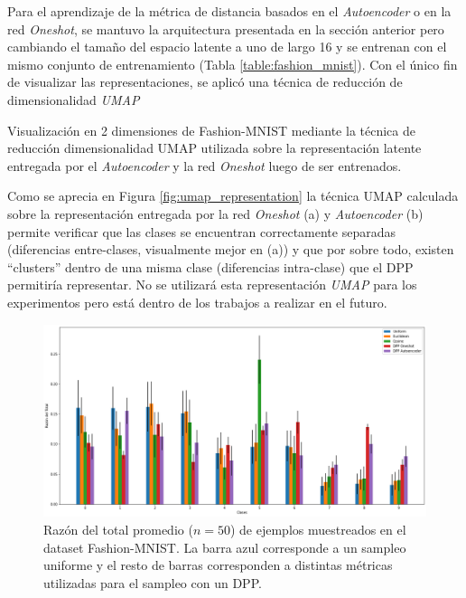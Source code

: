 Para el aprendizaje de la métrica de distancia basados en el \textit{Autoencoder} o en la red \textit{Oneshot}, se mantuvo la arquitectura presentada en la sección anterior pero cambiando el tamaño del espacio latente a uno de largo 16 y se entrenan con el mismo conjunto de entrenamiento (Tabla \ref{table:fashion_mnist}). Con el único fin de visualizar las representaciones, se aplicó una técnica de reducción de dimensionalidad \textit{UMAP} \cite{https://doi.org/10.48550/arxiv.1802.03426}

\begin{images}[\label{fig:umap_representation}]{\centering Visualización en 2 dimensiones de Fashion-MNIST mediante la técnica de reducción dimensionalidad UMAP utilizada sobre la representación latente entregada por el \textit{Autoencoder} y la red \textit{Oneshot} luego de ser entrenados.}

\end{images}

Como se aprecia en Figura \ref{fig:umap_representation} la técnica UMAP calculada sobre la representación entregada por la red \textit{Oneshot} (a) y  \textit{Autoencoder} (b) permite verificar que las clases se encuentran correctamente separadas (diferencias entre-clases, visualmente mejor en (a)) y que por sobre todo, existen ``clusters'' dentro de una misma clase (diferencias intra-clase) que el DPP permitiría representar. No se utilizará esta representación \textit{UMAP} para los experimentos pero está dentro de los trabajos a realizar en el futuro. 

\begin{figure}[ht]
    \centering
    \includegraphics[width=12cm]{img/tesis/resultados/sampling_n_10.png}
    \caption{Razón del total promedio ($n=50$) de ejemplos muestreados en el dataset Fashion-MNIST. La barra azul corresponde a un sampleo uniforme y el resto de barras corresponden a distintas métricas utilizadas para el sampleo con un DPP.}
    \label{fig:proporcion_sampling_mnist}
\end{figure}

